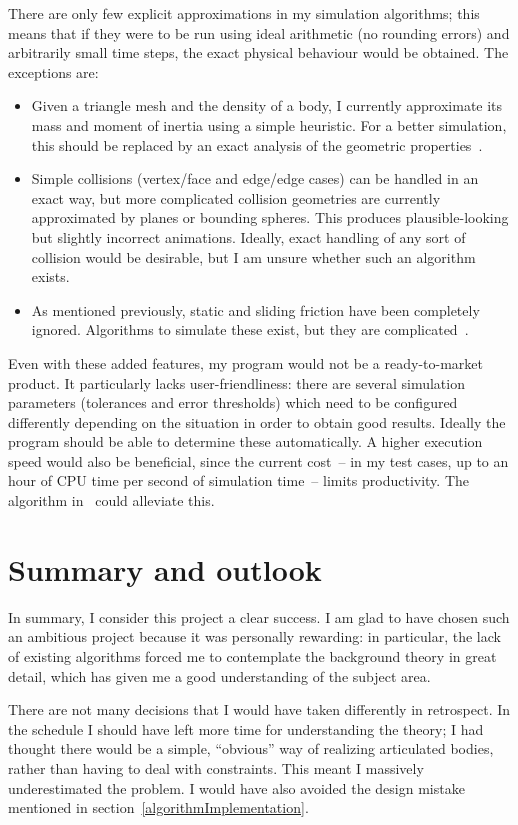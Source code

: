 There are only few explicit approximations in my simulation algorithms; this means that if they
were to be run using ideal arithmetic (no rounding errors) and arbitrarily small time steps,
the exact physical behaviour would be obtained. The exceptions are:
\begin{itemize}
\item Given a triangle mesh and the density of a body, I currently approximate its mass and moment
    of inertia using a simple heuristic. For a better simulation, this should be
    replaced by an exact analysis of the geometric properties~\cite{Mirtich:96}.
\item Simple collisions (vertex/face and edge/edge cases) can be handled in an exact way, but
    more complicated collision geometries are currently approximated by planes or bounding
    spheres. This produces plausible-looking but slightly incorrect animations. Ideally,
    exact handling of any sort of collision would be desirable, but I am unsure whether such
    an algorithm exists.
\item As mentioned previously, static and sliding friction have been completely ignored.
    Algorithms to simulate these exist, but they are complicated~\cite{Baraff:PhD}.
\end{itemize}

Even with these added features, my program would not be a ready-to-market product. It particularly
lacks user-friendliness: there are several simulation parameters (tolerances and error thresholds)
which need to be configured differently depending on the situation in order to obtain good
results. Ideally the program should be able to determine these automatically. A higher execution
speed would also be beneficial, since the current cost~-- in my test cases, up to an hour of CPU
time per second of simulation time~-- limits productivity. The algorithm in~\cite{Baraff:96}
could alleviate this.

\section{Summary and outlook}

In summary, I consider this project a clear success. I am glad to have chosen such an ambitious
project because it was personally rewarding: in particular, the lack of existing algorithms
forced me to contemplate the background theory in great detail, which has given me a good
understanding of the subject area.

There are not many decisions that I would have taken differently in retrospect. In the schedule I
should have left more time for understanding the theory; I had thought there would be a simple,
``obvious'' way of realizing articulated bodies, rather than having to deal with constraints. This
meant I massively underestimated the problem. I would have also avoided the design mistake
mentioned in section~\ref{algorithmImplementation}.

